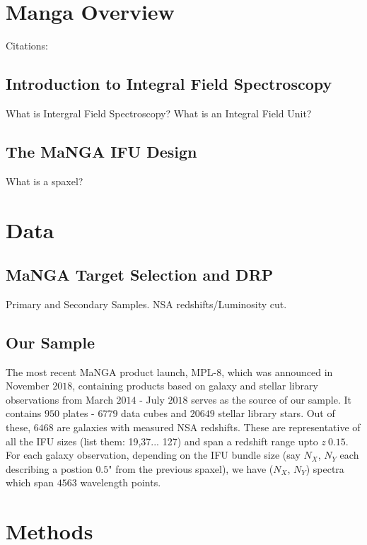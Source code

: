 \section{Manga Overview}
Citations: \citep{bundy_overview_2014}

\subsection{Introduction to Integral Field Spectroscopy}
What is Intergral Field Spectroscopy? What is an Integral Field Unit? 

\subsection{The MaNGA IFU Design}
What is a spaxel? \citep{drory_manga_2015}

\section{Data}
\subsection{MaNGA Target Selection and DRP}
Primary and Secondary Samples. NSA redshifts/Luminosity cut.

\subsection{Our Sample}
The most recent MaNGA product launch, MPL-$8$, which was announced in November $2018$, containing products based on galaxy and stellar library observations from March $2014$ - July $2018$ serves as the source of our sample. It contains $950$ plates - $6779$ data cubes and $20649$ stellar library stars. Out of these, $6468$ are galaxies with measured NSA redshifts. These are representative of all the IFU sizes (list them: 19,37... 127) and span a redshift range upto $z ~ 0.15$.\\
For each galaxy observation, depending on the IFU bundle size (say $N_{X}$, $N_{Y}$ each describing a postion $0.5$" from the previous spaxel), we have ($N_{X}$, $N_{Y}$) spectra which span $4563$ wavelength points. 

\section{Methods}

